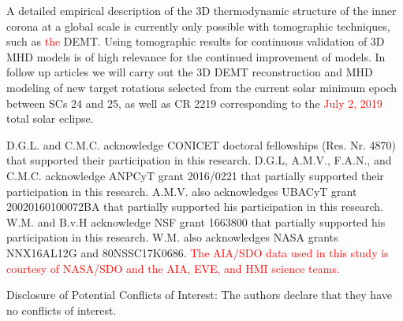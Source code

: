 \documentclass[namedreferences]{solarphysics}
\def\edit#1{\textcolor{Red}{#1}}
\begin{document}
\begin{article}
A detailed empirical description of the 3D thermodynamic structure of the inner corona at a global scale is currently only possible with tomographic techniques, such as \edit{the} DEMT. Using tomographic results for continuous validation of 3D MHD models is of high relevance for the continued improvement of models. In {follow up articles} we will {carry out the 3D DEMT reconstruction and MHD modeling of} new target rotations {selected from} the current solar minimum {epoch} between SCs 24 and 25, {as well as CR 2219 corresponding to the \edit{July 2, 2019} total solar eclipse.}

\begin{acks}
D.G.L. and C.M.C. {acknowledge} CONICET doctoral {fellowships} (Res. Nr. 4870) that supported {their} participation in this research. {D.G.L, A.M.V., F.A.N., and C.M.C. acknowledge ANPCyT grant 2016/0221 that partially supported their participation in this research. A.M.V. also acknowledges UBACyT grant 20020160100072BA that partially supported his participation in this research.} W.M. and B.v.H acknowledge NSF grant 1663800 that partially supported his participation in this research. W.M. also acknowledges NASA grants NNX16AL12G and 80NSSC17K0686. \edit{The AIA/SDO data used in this study is courtesy of NASA/SDO and the AIA, EVE, and HMI science teams.}
\end{acks}

\begin{footnotesize}
Disclosure of Potential Conflicts of Interest: The authors declare that they have no conflicts of interest.
\end{footnotesize}


  

\end{article} 
\end{document}
